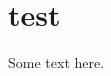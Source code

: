 \documentclass[10pt,twoside,a4paper]{article}
\begin{document}
\section{test}
Some text here.
\end{document}
